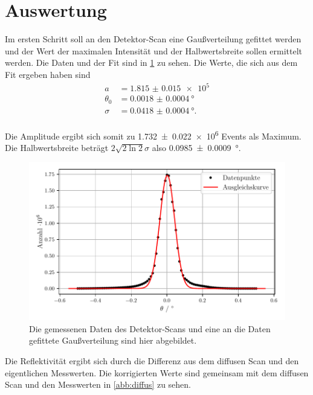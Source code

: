 \section{Auswertung}
\label{sec:Auswertung}

Im ersten Schritt soll an den Detektor-Scan eine Gaußverteilung gefittet werden und der Wert der maximalen Intensität und der Halbwertsbreite sollen ermittelt werden.
Die Daten und der Fit sind in \ref{abb:detector} zu sehen.
Die Werte, die sich aus dem Fit ergeben haben sind 
\begin{align*}
a &= \num{1.815(15)e5} \\
\theta_0 &= \SI{0.0018(4)}{\degree} \\
\sigma &= \SI{0.0418(4)}{\degree}. \\
\end{align*}

Die Amplitude ergibt sich somit zu \num{1.732(22)e6} Events als Maximum. 
Die Halbwertsbreite beträgt $2 \sqrt{2 \ln 2} \sigma$ also \SI{0.0985(9)}{\degree}.
\begin{figure}
    \centering
    \includegraphics[width=\textwidth]{figures/detector_scan.pdf}
    \caption{Die gemessenen Daten des Detektor-Scans und eine an die Daten gefittete Gaußverteilung sind hier abgebildet.}
    \label{abb:detector}
\end{figure}

Die Reflektivität ergibt sich durch die Differenz aus dem diffusen Scan und den eigentlichen Messwerten. Die korrigierten Werte sind gemeinsam mit dem diffusen Scan und den Messwerten in \ref{abb:diffus} zu sehen.

